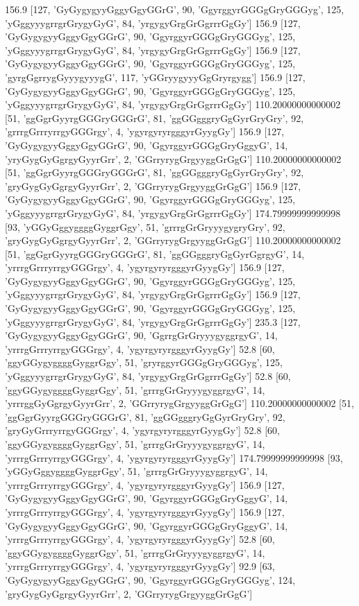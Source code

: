 156.9 [127, 'GyGygygyyGggyGgyGGrG', 90, 'GgyrggyrGGGgGryGGGyg', 125, 'yGggyyygrrgrGrygyGyG', 84, 'yrgygyGrgGrGgrrrGgGy']
156.9 [127, 'GyGygygyyGggyGgyGGrG', 90, 'GgyrggyrGGGgGryGGGyg', 125, 'yGggyyygrrgrGrygyGyG', 84, 'yrgygyGrgGrGgrrrGgGy']
156.9 [127, 'GyGygygyyGggyGgyGGrG', 90, 'GgyrggyrGGGgGryGGGyg', 125, 'gyrgGgrrygGyyygyyygG', 117, 'yGGryygyyyGgGryrgygg']
156.9 [127, 'GyGygygyyGggyGgyGGrG', 90, 'GgyrggyrGGGgGryGGGyg', 125, 'yGggyyygrrgrGrygyGyG', 84, 'yrgygyGrgGrGgrrrGgGy']
110.20000000000002 [51, 'ggGgrGyyrgGGGryGGGrG', 81, 'ggGGgggryGgGyrGryGry', 92, 'grrrgGrrryrrgyGGGrgy', 4, 'ygyrgyryrgggyrGyygGy']
156.9 [127, 'GyGygygyyGggyGgyGGrG', 90, 'GgyrggyrGGGgGryGggyG', 14, 'yryGygGyGgrgyGyyrGrr', 2, 'GGrryrygGrgyyggGrGgG']
110.20000000000002 [51, 'ggGgrGyyrgGGGryGGGrG', 81, 'ggGGgggryGgGyrGryGry', 92, 'gryGygGyGgrgyGyyrGrr', 2, 'GGrryrygGrgyyggGrGgG']
156.9 [127, 'GyGygygyyGggyGgyGGrG', 90, 'GgyrggyrGGGgGryGGGyg', 125, 'yGggyyygrrgrGrygyGyG', 84, 'yrgygyGrgGrGgrrrGgGy']
174.79999999999998 [93, 'yGGyGggyggggGyggrGgy', 51, 'grrrgGrGryyygygryGry', 92, 'gryGygGyGgrgyGyyrGrr', 2, 'GGrryrygGrgyyggGrGgG']
110.20000000000002 [51, 'ggGgrGyyrgGGGryGGGrG', 81, 'ggGGgggryGgGyrGgrgyG', 14, 'yrrrgGrrryrrgyGGGrgy', 4, 'ygyrgyryrgggyrGyygGy']
156.9 [127, 'GyGygygyyGggyGgyGGrG', 90, 'GgyrggyrGGGgGryGGGyg', 125, 'yGggyyygrrgrGrygyGyG', 84, 'yrgygyGrgGrGgrrrGgGy']
156.9 [127, 'GyGygygyyGggyGgyGGrG', 90, 'GgyrggyrGGGgGryGGGyg', 125, 'yGggyyygrrgrGrygyGyG', 84, 'yrgygyGrgGrGgrrrGgGy']
235.3 [127, 'GyGygygyyGggyGgyGGrG', 90, 'GgrrgGrGryyygyggrgyG', 14, 'yrrrgGrrryrrgyGGGrgy', 4, 'ygyrgyryrgggyrGyygGy']
52.8 [60, 'ggyGGygyggggGyggrGgy', 51, 'gryrggyrGGGgGryGGGyg', 125, 'yGggyyygrrgrGrygyGyG', 84, 'yrgygyGrgGrGgrrrGgGy']
52.8 [60, 'ggyGGygyggggGyggrGgy', 51, 'grrrgGrGryyygyggrgyG', 14, 'yrrrggGyGgrgyGyyrGrr', 2, 'GGrryrygGrgyyggGrGgG']
110.20000000000002 [51, 'ggGgrGyyrgGGGryGGGrG', 81, 'ggGGgggryGgGyrGryGry', 92, 'gryGyGrrryrrgyGGGrgy', 4, 'ygyrgyryrgggyrGyygGy']
52.8 [60, 'ggyGGygyggggGyggrGgy', 51, 'grrrgGrGryyygyggrgyG', 14, 'yrrrgGrrryrrgyGGGrgy', 4, 'ygyrgyryrgggyrGyygGy']
174.79999999999998 [93, 'yGGyGggyggggGyggrGgy', 51, 'grrrgGrGryyygyggrgyG', 14, 'yrrrgGrrryrrgyGGGrgy', 4, 'ygyrgyryrgggyrGyygGy']
156.9 [127, 'GyGygygyyGggyGgyGGrG', 90, 'GgyrggyrGGGgGryGggyG', 14, 'yrrrgGrrryrrgyGGGrgy', 4, 'ygyrgyryrgggyrGyygGy']
156.9 [127, 'GyGygygyyGggyGgyGGrG', 90, 'GgyrggyrGGGgGryGggyG', 14, 'yrrrgGrrryrrgyGGGrgy', 4, 'ygyrgyryrgggyrGyygGy']
52.8 [60, 'ggyGGygyggggGyggrGgy', 51, 'grrrgGrGryyygyggrgyG', 14, 'yrrrgGrrryrrgyGGGrgy', 4, 'ygyrgyryrgggyrGyygGy']
92.9 [63, 'GyGygygyyGggyGgyGGrG', 90, 'GgyrggyrGGGgGryGGGyg', 124, 'gryGygGyGgrgyGyyrGrr', 2, 'GGrryrygGrgyyggGrGgG']
